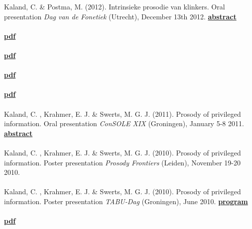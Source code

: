 \documentclass[a4paper,11pt]{article}
\begin{document}
Kaland, C. \& Postma, M. (2012). Intrinsieke prosodie van klinkers. Oral presentation \textit{Dag van de Fonetiek} (Utrecht), December 13th 2012. \textcolor{red}{\textbf{\lbrack\href{http://www.fon.hum.uva.nl/FonetischeVereniging/DvdFonetiek/DagvdFonetiek2012abstracts.html\#pres11}{abstract}\rbrack}}\\\\
 \textcolor{red}{\textbf{\lbrack\href{http://www.isca-speech.org/archive/archive_papers/interspeech_2012/i12_1047.pdf}{pdf}\rbrack}}\\\\
 \textcolor{red}{\textbf{\lbrack\href{http://isle.illinois.edu/sprosig/sp2012/uploadfiles/file/sp2012_submission_115.pdf}{pdf}\rbrack}}\\\\
 \textcolor{red}{\textbf{\lbrack\href{https://www.internationalphoneticassociation.org/icphs-proceedings/ICPhS2011/OnlineProceedings/RegularSession/Kaland/Kaland.pdf}{pdf}\rbrack}}\\\\
 \textcolor{red}{\textbf{\lbrack\href{https://mindmodeling.org/cogsci2011/papers/0051/paper0051.pdf}{pdf}\rbrack}}\\\\
Kaland, C. , Krahmer, E. J. \& Swerts, M. G. J. (2011). Prosody of privileged information. Oral presentation \textit{ConSOLE XIX} (Groningen), January 5-8 2011. \textcolor{red}{\textbf{\lbrack\href{http://www.let.rug.nl/console19/abstracts/Kaland-Krahmer-Swerts.pdf}{abstract}\rbrack}}\\\\
Kaland, C. , Krahmer, E. J. \& Swerts, M. G. J. (2010). Prosody of privileged information. Poster presentation \textit{Prosody Frontiers} (Leiden), November 19-20 2010.\\\\
Kaland, C. , Krahmer, E. J. \& Swerts, M. G. J. (2010). Prosody of privileged information. Poster presentation \textit{TABU-Dag} (Groningen), June 2010. \textcolor{red}{\textbf{\lbrack\href{http://www.let.rug.nl/tabudag/archive/2010/accepted_abstracts_tabudag_2010.pdf}{program}\rbrack}}\\\\
 \textcolor{red}{\textbf{\lbrack\href{https://www.isca-speech.org/archive/sp2010/papers/sp10_064.pdf}{pdf}\rbrack}}\\\\
\end{document}
